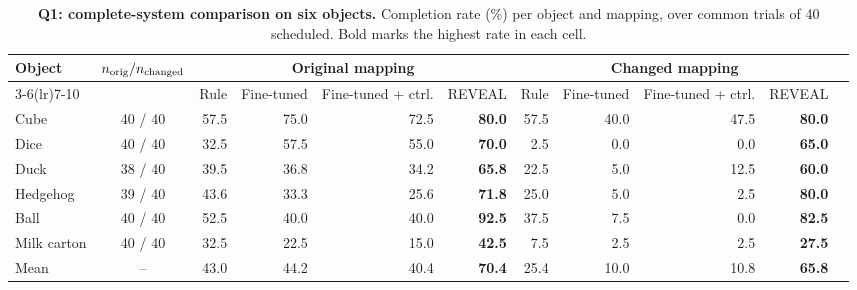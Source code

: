 \begin{table}[t]
\centering\scriptsize
\setlength{\tabcolsep}{3.5pt}
\begin{tabular*}{\textwidth}{@{\extracolsep{\fill}}lcrrrrrrrrr@{}}
\toprule
Object & $n_{\rm orig}/n_{\rm changed}$ & \multicolumn{4}{c}{Original mapping} & \multicolumn{4}{c}{Changed mapping}\\
\cmidrule(lr){3-6}\cmidrule(lr){7-10}
& & Rule & Fine-tuned & Fine-tuned + ctrl. & REVEAL & Rule & Fine-tuned & Fine-tuned + ctrl. & REVEAL\\
\midrule
Cube & 40 / 40 & 57.5 & 75.0 & 72.5 & \textbf{80.0} & 57.5 & 40.0 & 47.5 & \textbf{80.0}\\
Dice & 40 / 40 & 32.5 & 57.5 & 55.0 & \textbf{70.0} & 2.5 & 0.0 & 0.0 & \textbf{65.0}\\
Duck & 38 / 40 & 39.5 & 36.8 & 34.2 & \textbf{65.8} & 22.5 & 5.0 & 12.5 & \textbf{60.0}\\
Hedgehog & 39 / 40 & 43.6 & 33.3 & 25.6 & \textbf{71.8} & 25.0 & 5.0 & 2.5 & \textbf{80.0}\\
Ball & 40 / 40 & 52.5 & 40.0 & 40.0 & \textbf{92.5} & 37.5 & 7.5 & 0.0 & \textbf{82.5}\\
Milk carton & 40 / 40 & 32.5 & 22.5 & 15.0 & \textbf{42.5} & 7.5 & 2.5 & 2.5 & \textbf{27.5}\\
\midrule
Mean & -- & 43.0 & 44.2 & 40.4 & \textbf{70.4} & 25.4 & 10.0 & 10.8 & \textbf{65.8}\\
\bottomrule
\end{tabular*}
\caption{\textbf{Q1: complete-system comparison on six objects.} Completion rate (\%) per object and mapping, over common trials of 40 scheduled. Bold marks the highest rate in each cell.}
\label{tab:q1-four-way}
\end{table}
